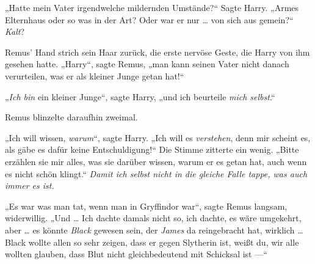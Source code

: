 „Hatte mein Vater irgendwelche mildernden Umstände?“ Sagte Harry.
„Armes Elternhaus oder so was in der Art? Oder war er nur … von sich aus gemein?“ \emph{Kalt}?

Remus’ Hand strich sein Haar zurück, die erste nervöse Geste, die Harry von ihm gesehen hatte.
„Harry“, sagte Remus, „man kann seinen Vater nicht danach verurteilen, was er als kleiner Junge getan hat!“

„\emph{Ich bin} ein kleiner Junge“, sagte Harry, „und ich beurteile \emph{mich selbst}.“

Remus blinzelte daraufhin zweimal.

„Ich will wissen, \emph{warum}“, sagte Harry.
„Ich will es \emph{verstehen}, denn mir scheint es, als gäbe es dafür keine Entschuldigung!“ Die Stimme zitterte ein wenig.
„Bitte erzählen sie mir alles, was sie darüber wissen, warum er es getan hat, auch wenn es nicht schön klingt.“ \emph{Damit ich selbst nicht in die gleiche Falle tappe, was auch immer es ist.}

„Es war was man tat, wenn man in Gryffindor war“, sagte Remus langsam, widerwillig.
„Und … Ich dachte damals nicht so, ich dachte, es wäre umgekehrt, aber … es könnte \emph{Black} gewesen sein, der \emph{James} da reingebracht hat, wirklich … Black wollte allen so sehr zeigen, dass er gegen Slytherin ist, weißt du, wir alle wollten glauben, dass Blut nicht gleichbedeutend mit Schicksal ist —“

